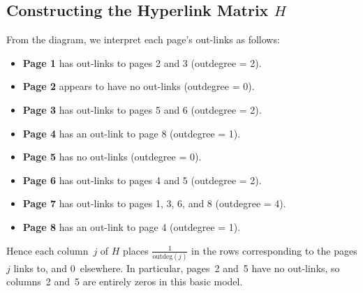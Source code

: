 \documentclass{article}
\begin{document}
\subsection{Constructing the Hyperlink Matrix $H$}

From the diagram, we interpret each page's out-links as follows:
\begin{itemize}
  \item \textbf{Page 1} has out-links to pages 2 and 3 (outdegree = 2).
  \item \textbf{Page 2} appears to have no out-links (outdegree = 0).
  \item \textbf{Page 3} has out-links to pages 5 and 6 (outdegree = 2).
  \item \textbf{Page 4} has an out-link to page 8 (outdegree = 1).
  \item \textbf{Page 5} has no out-links (outdegree = 0).
  \item \textbf{Page 6} has out-links to pages 4 and 5 (outdegree = 2).
  \item \textbf{Page 7} has out-links to pages 1, 3, 6, and 8 (outdegree = 4).
  \item \textbf{Page 8} has an out-link to page 4 (outdegree = 1).
\end{itemize}
Hence each column~$j$ of $H$ places $\tfrac{1}{\text{outdeg}(j)}$ in the rows 
corresponding to the pages $j$ links to, and $0$~elsewhere. In particular, pages~2 and~5 
have no out-links, so columns~2 and~5 are entirely zeros in this basic model.

\bigskip
\end{document}
